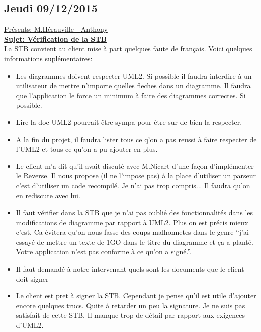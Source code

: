 \documentclass[a4paper,10pt]{article}
\begin{document}
\subsection{Jeudi 09/12/2015}
\underline{Présents: M.Hérauville - Anthony}\\
\textbf{\underline{Sujet: Vérification de la STB}} \\
La STB convient au client mise à part quelques faute de français. Voici quelques informations suplémentaires:
\begin{itemize}
 \item Les diagrammes doivent respecter UML2. Si possible il faudra interdire à un utilisateur de mettre n'importe quelles fleches dans un diagramme.
      Il faudra que l'application le force un minimum à faire des diagrammes correctes. Si possible.
 \item Lire la doc UML2 pourrait être sympa pour être sur de bien la respecter.
 \item A la fin du projet, il faudra lister tous ce q'on a pas reussi à faire respecter de l'UML2 et tous ce qu'on a pu ajouter en plus.
 \item Le client m'a dit qu'il avait discuté avec M.Nicart d'une façon d'implémenter le Reverse. Il nous propose (il ne l'impose pas) à la place 
    d'utiliser un parseur c'est d'utiliser un code recompilé. Je n'ai pas trop compris... Il faudra qu'on en rediscute avec lui.
 \item Il faut vérifier dans la STB que je n'ai pas oublié des fonctionnalités dans les modifications de diagramme par rapport à UML2. Plus on est précis
    mieux c'est. Ca évitera qu'on nous fasse des coups malhonnetes dans le genre ``j'ai essayé de mettre un texte de 1GO dans le titre du diagramme et ça a planté.
    Votre application n'est pas conforme à ce qu'on a signé.''.
 \item Il faut demandé à notre intervenant quels sont les documents que le client doit signer
 \item Le client est pret à signer la STB. Cependant je pense qu'il est utile d'ajouter encore quelques trucs. Quite à retarder un peu la signature.
 Je ne suis pas satisfait de cette STB. Il manque trop de détail par rapport aux exigences d'UML2.
\end{itemize}
\end{document}
